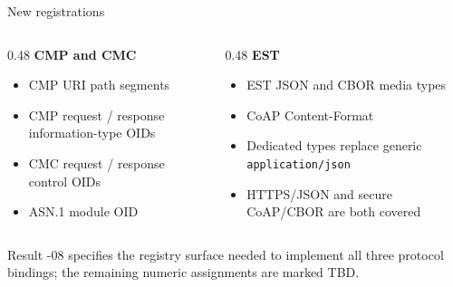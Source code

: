 \documentclass[aspectratio=169,10pt]{beamer}
\begin{document}
\begin{frame}{New registrations}
  \begin{columns}[T,onlytextwidth]
    \begin{column}{0.48\textwidth}
      \textbf{CMP and CMC}
      \begin{itemize}
        \item CMP URI path segments
        \item CMP request / response information-type OIDs
        \item CMC request / response control OIDs
        \item ASN.1 module OID
      \end{itemize}
    \end{column}
    \begin{column}{0.48\textwidth}
      \textbf{EST}
      \begin{itemize}
        \item EST JSON and CBOR media types
        \item CoAP Content-Format
        \item Dedicated types replace generic
              \texttt{application/json}
        \item HTTPS/JSON and secure CoAP/CBOR are both covered
      \end{itemize}
    \end{column}
  \end{columns}
\vspace{0.5cm}
\begin{block}{Result}
  -08 specifies the registry surface needed to implement all three protocol
  bindings; the remaining numeric assignments are marked TBD.
\end{block}
\end{frame}
\end{document}
